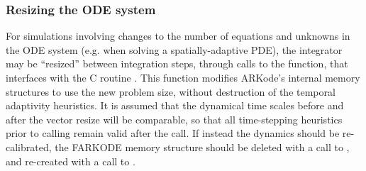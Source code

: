 \documentclass[letterpaper,10pt,english]{sphinxmanual}
\begin{document}
\subsubsection{Resizing the ODE system}
\label{f_interface/Usage:finterface-resize}\label{f_interface/Usage:resizing-the-ode-system}
For simulations involving changes to the number of equations and
unknowns in the ODE system (e.g. when solving a spatially-adaptive
PDE), the {\hyperref[f_interface/Usage:f/_/FARKODE]{}} integrator may be ``resized'' between
integration steps, through calls to the {\hyperref[f_interface/Usage:f/_/FARKRESIZE]{}}
function, that interfaces with the C routine {\hyperref[c_interface/User_callable:ARKodeResize]{}}.
This function modifies ARKode's internal memory structures to use the
new problem size, without destruction of the temporal adaptivity
heuristics.  It is assumed that the dynamical time scales before and
after the vector resize will be comparable, so that all time-stepping
heuristics prior to calling  remain valid after
the call.  If instead the dynamics should be re-calibrated, the
FARKODE memory structure should be deleted with a call to
{\hyperref[f_interface/Usage:f/_/FARKFREE]{}}, and re-created with a call to
{\hyperref[f_interface/Usage:f/_/FARKMALLOC]{}}.
\end{document}
